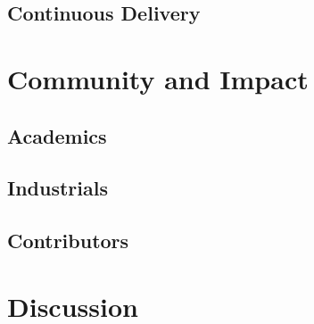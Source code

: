 \subsection{Continuous Delivery}

\section{Community and Impact}

\subsection{Academics}
\subsection{Industrials}
\subsection{Contributors}

\section{Discussion}